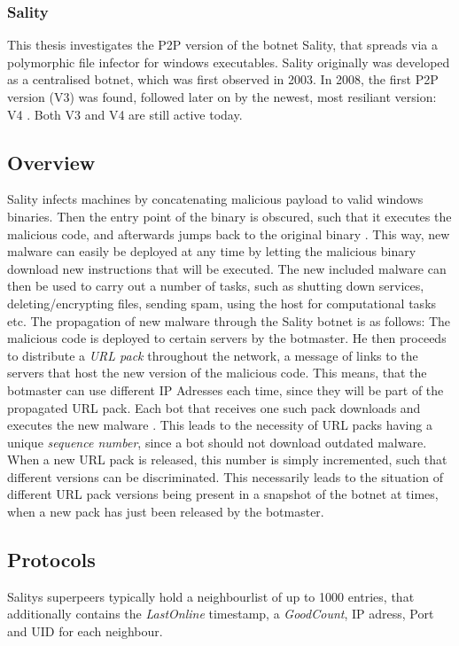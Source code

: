 \documentclass{article}
\begin{document}
\subsubsection{Sality} \label{sec:Sality}
This thesis investigates the P2P version of the botnet Sality, that spreads via a polymorphic file infector for windows executables. Sality originally was developed as a centralised botnet, which was first observed in 2003. In 2008, the first P2P version (V3) was found, followed later on by the newest, most resiliant version: V4 \cite{P2PWNED}. Both V3 and V4 are still active today. \\

\subsection*{Overview} \label{subsec:SalityOverview}
Sality infects machines by concatenating malicious payload to valid windows binaries. Then the entry point of the binary is obscured, such that it executes the malicious code, and afterwards jumps back to the original binary \cite{SP2PVN}. This way, new malware can easily be deployed at any time by letting the malicious binary download new instructions that will be executed. The new included malware can then be used to carry out a number of tasks, such as shutting down services, deleting/encrypting files, sending spam, using the host for computational tasks etc. The propagation of new malware through the Sality botnet is as follows: The malicious code is deployed to certain servers by the botmaster. He then proceeds to distribute a \emph{URL pack} throughout the network, a message of links to the servers that host the new version of the malicious code. This means, that the botmaster can use different IP Adresses each time, since they will be part of the propagated URL pack. Each bot that receives one such pack downloads and executes the new malware \cite{SP2PVN}. This leads to the necessity of URL packs having a unique \emph{sequence number}, since a bot should not download outdated malware. When a new URL pack is released, this number is simply incremented, such that different versions can be discriminated. This necessarily leads to the situation of different URL pack versions being present in a snapshot of the botnet at times, when a new pack has just been released by the botmaster. \\

\subsection*{Protocols} \label{subsec:SalityProtocols}
Salitys superpeers typically hold a neighbourlist of up to 1000 entries, that additionally contains the \emph{LastOnline} timestamp, a \emph{GoodCount}, IP adress, Port and UID for each neighbour. \\
\end{document}
